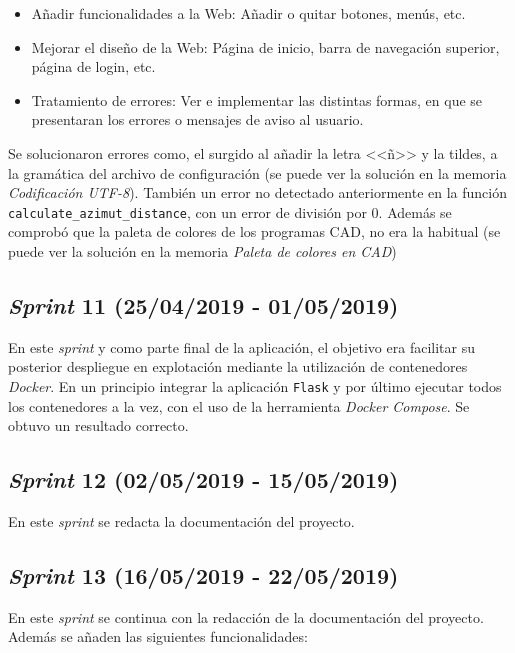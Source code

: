 \begin{itemize}
\item Añadir funcionalidades a la Web: Añadir o quitar botones, menús, etc.

\item  Mejorar el diseño de la Web: Página de inicio, barra de navegación superior, página de login, etc.

\item Tratamiento de errores: Ver e implementar las distintas formas, en que se presentaran los errores o mensajes de aviso al usuario.

\end{itemize}

Se solucionaron errores como, el surgido al añadir la letra <<ñ>> y la tildes, a la gramática del archivo de configuración (se puede ver la solución en la memoria \textit{ Codificación UTF-8}). También un error no detectado anteriormente en la función  \texttt{calculate\_azimut\_distance}, con un error de división por 0.
Además se comprobó que la paleta de colores de los programas CAD, no era la habitual (se puede ver la solución en la memoria \textit{ Paleta de colores en CAD})

\subsection{\emph{Sprint} 11 (25/04/2019 - 01/05/2019)}

En este \emph{sprint} y como parte final de la aplicación, el objetivo era facilitar su posterior despliegue en explotación mediante la utilización de contenedores \emph{Docker}. En un principio integrar la aplicación \texttt{Flask} y por último ejecutar todos los contenedores a la vez, con el uso de la herramienta \emph{Docker Compose}. Se obtuvo un resultado correcto.

\subsection{\emph{Sprint} 12 (02/05/2019 - 15/05/2019)}

En este \emph{sprint} se redacta la documentación del proyecto.

\subsection{\emph{Sprint} 13 (16/05/2019 - 22/05/2019)}

En este \emph{sprint} se continua con la redacción de la documentación del proyecto. Además se añaden las siguientes funcionalidades:

